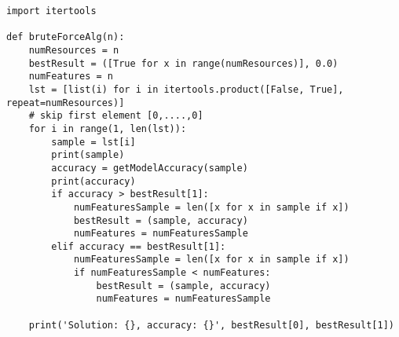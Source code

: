 \documentclass[11pt]{article} %
\begin{document}
\begin{lstlisting}
import itertools

def bruteForceAlg(n):
    numResources = n 
    bestResult = ([True for x in range(numResources)], 0.0)
    numFeatures = n
    lst = [list(i) for i in itertools.product([False, True], repeat=numResources)]
    # skip first element [0,....,0]
    for i in range(1, len(lst)):
        sample = lst[i]
        print(sample)
        accuracy = getModelAccuracy(sample)
        print(accuracy)
        if accuracy > bestResult[1]:
            numFeaturesSample = len([x for x in sample if x])
            bestResult = (sample, accuracy)
            numFeatures = numFeaturesSample
        elif accuracy == bestResult[1]:
            numFeaturesSample = len([x for x in sample if x])
            if numFeaturesSample < numFeatures:
                bestResult = (sample, accuracy)
                numFeatures = numFeaturesSample
                
    print('Solution: {}, accuracy: {}', bestResult[0], bestResult[1])
\end{lstlisting}
\end{document}
